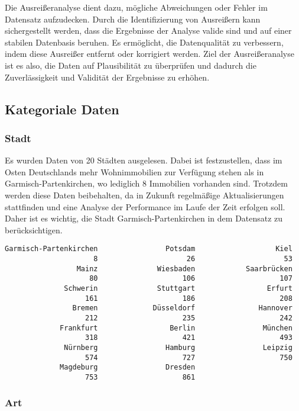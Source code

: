 Die Ausreißeranalyse dient dazu, mögliche Abweichungen oder Fehler im Datensatz aufzudecken. Durch die Identifizierung von Ausreißern kann sichergestellt werden, dass die Ergebnisse der Analyse valide sind und auf einer stabilen Datenbasis beruhen. Es ermöglicht, die Datenqualität zu verbessern, indem diese Ausreißer entfernt oder korrigiert werden. Ziel der Ausreißeranalyse ist es also, die Daten auf Plausibilität zu überprüfen und dadurch die Zuverlässigkeit und Validität der Ergebnisse zu erhöhen.

\subsection{Kategoriale Daten}

\subsubsection{Stadt}
Es wurden Daten von 20 Städten ausgelesen. Dabei ist festzustellen, dass im Osten Deutschlands mehr Wohnimmobilien zur Verfügung stehen als in Garmisch-Partenkirchen, wo lediglich 8 Immobilien vorhanden sind. Trotzdem werden diese Daten beibehalten, da in Zukunft regelmäßige Aktualisierungen stattfinden und eine Analyse der Performance im Laufe der Zeit erfolgen soll. Daher ist es wichtig, die Stadt Garmisch-Partenkirchen in dem Datensatz zu berücksichtigen.

\begin{verbatim}
Garmisch-Partenkirchen                Potsdam                   Kiel 
                     8                     26                     53 
                 Mainz              Wiesbaden            Saarbrücken 
                    80                    106                    107 
              Schwerin              Stuttgart                 Erfurt 
                   161                    186                    208 
                Bremen             Düsseldorf               Hannover 
                   212                    235                    242 
             Frankfurt                 Berlin                München 
                   318                    421                    493 
              Nürnberg                Hamburg                Leipzig 
                   574                    727                    750 
             Magdeburg                Dresden 
                   753                    861 
\end{verbatim}

\subsubsection{Art}

